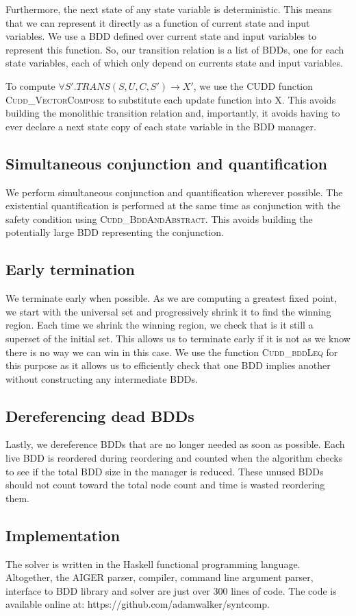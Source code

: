 Furthermore, the next state of any state variable is deterministic. This means that we can represent it directly as a function of current state and input variables. We use a BDD defined over current state and input variables to represent this function. So, our transition relation is a list of BDDs, one for each state variables, each of which only depend on currents state and input variables. 

To compute $\forall S'. TRANS(S, U, C, S') \rightarrow X'$, we use the CUDD function \textsc{Cudd\_VectorCompose} to substitute each update function into X. This avoids building the monolithic transition relation and, importantly, it avoids having to ever declare a next state copy of each state variable in the BDD manager. 

\subsection{Simultaneous conjunction and quantification}
We perform simultaneous conjunction and quantification wherever possible. The existential quantification is performed at the same time as conjunction with the safety condition using \textsc{Cudd\_BddAndAbstract}. This avoids building the potentially large BDD representing the conjunction.

\subsection{Early termination}
We terminate early when possible. As we are computing a greatest fixed point, we start with the universal set and progressively shrink it to find the winning region. Each time we shrink the winning region, we check that is it still a superset of the initial set. This allows us to terminate early if it is not as we know there is no way we can win in this case. We use the function \textsc{Cudd\_bddLeq} for this purpose as it allows us to efficiently check that one BDD implies another without constructing any intermediate BDDs.

\subsection{Dereferencing dead BDDs}
Lastly, we dereference BDDs that are no longer needed as soon as possible. Each live BDD is reordered during reordering and counted when the algorithm checks to see if the total BDD size in the manager is reduced. These unused BDDs should not count toward the total node count and time is wasted reordering them.

\subsection{Implementation}
The solver is written in the Haskell functional programming language. Altogether, the AIGER parser, compiler, command line argument parser, interface to BDD library and solver are just over 300 lines of code. The code is available online at: https://github.com/adamwalker/syntcomp.

